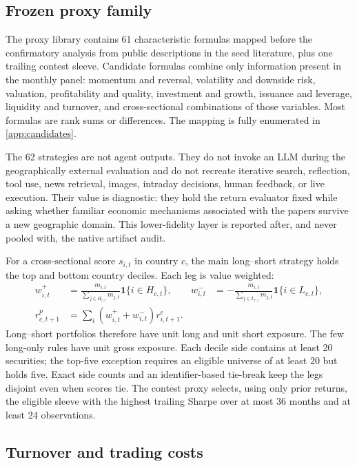 \documentclass[11pt]{article}
\begin{document}
\subsection{Frozen proxy family}

The proxy library contains 61 characteristic formulas mapped before the confirmatory analysis from public descriptions in the seed literature, plus one trailing contest sleeve. Candidate formulas combine only information present in the monthly panel: momentum and reversal, volatility and downside risk, valuation, profitability and quality, investment and growth, issuance and leverage, liquidity and turnover, and cross-sectional combinations of those variables. Most formulas are rank sums or differences. The mapping is fully enumerated in \cref{app:candidates}.

The 62 strategies are not agent outputs. They do not invoke an LLM during the geographically external evaluation and do not recreate iterative search, reflection, tool use, news retrieval, images, intraday decisions, human feedback, or live execution. Their value is diagnostic: they hold the return evaluator fixed while asking whether familiar economic mechanisms associated with the papers survive a new geographic domain. This lower-fidelity layer is reported after, and never pooled with, the native artifact audit.

For a cross-sectional score $s_{i,t}$ in country $c$, the main long--short strategy holds the top and bottom country deciles. Each leg is value weighted:
\begin{align}
 w^{+}_{i,t} &= \frac{m_{i,t}}{\sum_{j\in H_{c,t}}m_{j,t}}\mathbf{1}\{i\in H_{c,t}\}, &
 w^{-}_{i,t} &= -\frac{m_{i,t}}{\sum_{j\in L_{c,t}}m_{j,t}}\mathbf{1}\{i\in L_{c,t}\}, \\
 r^{p}_{c,t+1} &= \sum_i \left(w^{+}_{i,t}+w^{-}_{i,t}\right)r^{e}_{i,t+1}.
\end{align}
Long--short portfolios therefore have unit long and unit short exposure. The few long-only rules have unit gross exposure. Each decile side contains at least 20 securities; the top-five exception requires an eligible universe of at least 20 but holds five. Exact side counts and an identifier-based tie-break keep the legs disjoint even when scores tie. The contest proxy selects, using only prior returns, the eligible sleeve with the highest trailing Sharpe over at most 36 months and at least 24 observations.

\subsection{Turnover and trading costs}
\end{document}
